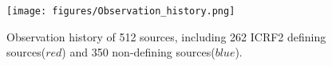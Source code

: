 \documentclass{aa}
\begin{document}
	\begin{figure}
   \centering
   \texttt{[image: figures/Observation\_history.png]}
      \caption{
      Observation history of 512 sources, including 262 ICRF2 defining sources($red$) and 350 non-defining sources($blue$).
              }
         \label{Fig:ObsHis}
   \end{figure}
   
\end{document}
